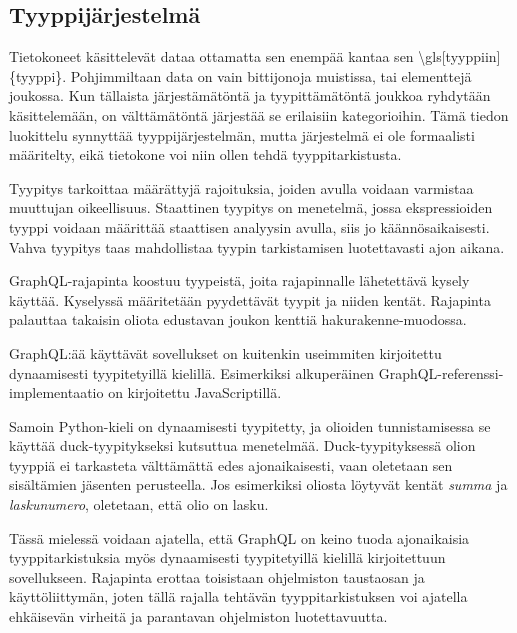 \hypertarget{tyyppijuxe4rjestelmuxe4}{%
\subsection{Tyyppijärjestelmä}\label{tyyppijuxe4rjestelmuxe4}}

Tietokoneet käsittelevät dataa ottamatta sen enempää kantaa sen
\textbackslash{}gls{[}tyyppiin{]}\{tyyppi\}. Pohjimmiltaan data on vain
bittijonoja muistissa, tai elementtejä joukossa. Kun tällaista
järjestämätöntä ja tyypittämätöntä joukkoa ryhdytään käsittelemään, on
välttämätöntä järjestää se erilaisiin kategorioihin. Tämä tiedon
luokittelu synnyttää tyyppijärjestelmän, mutta järjestelmä ei ole
formaalisti määritelty, eikä tietokone voi niin ollen tehdä
tyyppitarkistusta.

Tyypitys tarkoittaa määrättyjä rajoituksia, joiden avulla voidaan
varmistaa muuttujan oikeellisuus. Staattinen tyypitys on menetelmä,
jossa ekspressioiden tyyppi voidaan määrittää staattisen analyysin
avulla, siis jo käännösaikaisesti. Vahva tyypitys taas mahdollistaa
tyypin tarkistamisen luotettavasti ajon aikana.
\cite{Cardelli+Wegner:1985}

GraphQL-rajapinta koostuu tyypeistä, joita rajapinnalle lähetettävä
kysely käyttää. Kyselyssä määritetään pyydettävät tyypit ja niiden
kentät. Rajapinta palauttaa takaisin oliota edustavan joukon kenttiä
\gls{hakurakenne}-muodossa. \cite{graphql:spec}

GraphQL:ää käyttävät sovellukset on kuitenkin useimmiten kirjoitettu
dynaamisesti tyypitetyillä kielillä. Esimerkiksi alkuperäinen
GraphQL-referenssi-implementaatio on kirjoitettu
JavaScriptillä.\cite{graphqlRefImple2021Oct}

Samoin Python-kieli on dynaamisesti tyypitetty, ja olioiden
tunnistamisessa se käyttää duck-tyypitykseksi kutsuttua menetelmää.
Duck-tyypityksessä olion tyyppiä ei tarkasteta välttämättä edes
ajonaikaisesti, vaan oletetaan sen sisältämien jäsenten
perusteella.\cite{pythonGloss2021Oct} Jos esimerkiksi oliosta löytyvät
kentät \emph{summa} ja \emph{laskunumero}, oletetaan, että olio on
lasku.

Tässä mielessä voidaan ajatella, että GraphQL on keino tuoda
ajonaikaisia tyyppitarkistuksia myös dynaamisesti tyypitetyillä kielillä
kirjoitettuun sovellukseen. Rajapinta erottaa toisistaan ohjelmiston
taustaosan ja käyttöliittymän, joten tällä rajalla tehtävän
tyyppitarkistuksen voi ajatella ehkäisevän virheitä ja parantavan
ohjelmiston luotettavuutta.

